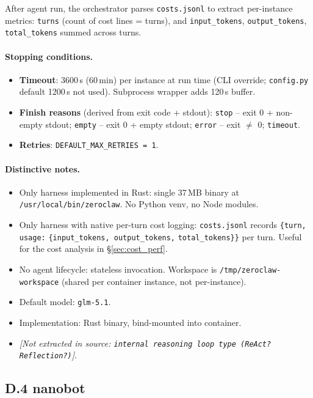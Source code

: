 After agent run, the orchestrator parses \texttt{costs.jsonl} to extract per-instance metrics: \texttt{turns} (count of cost lines = turns), and \texttt{input\_tokens}, \texttt{output\_tokens}, \texttt{total\_tokens} summed across turns.

\paragraph{Stopping conditions.}
\begin{itemize}
  \item \textbf{Timeout}: 3600\,s (60\,min) per instance at run time (CLI override; \texttt{config.py} default 1200\,s not used). Subprocess wrapper adds 120\,s buffer.
  \item \textbf{Finish reasons} (derived from exit code + stdout): \texttt{stop} -- exit 0 + non-empty stdout; \texttt{empty} -- exit 0 + empty stdout; \texttt{error} -- exit $\neq$ 0; \texttt{timeout}.
  \item \textbf{Retries}: \texttt{DEFAULT\_MAX\_RETRIES = 1}.
\end{itemize}

\paragraph{Distinctive notes.}
\begin{itemize}
  \item Only harness implemented in Rust: single 37\,MB binary at \texttt{/usr/local/bin/zeroclaw}. No Python venv, no Node modules.
  \item Only harness with native per-turn cost logging: \texttt{costs.jsonl} records \texttt{\{turn, usage:} \texttt{\{input\_tokens, output\_tokens,} \texttt{total\_tokens\}\}} per turn. Useful for the cost analysis in \S\ref{sec:cost_perf}.
  \item No agent lifecycle: stateless invocation. Workspace is \texttt{/tmp/zeroclaw-workspace} (shared per container instance, not per-instance).
  \item Default model: \texttt{glm-5.1}.
  \item Implementation: Rust binary, bind-mounted into container.
  \item \textit{[Not extracted in source: \texttt{internal reasoning loop type (ReAct? Reflection?)}]}.
\end{itemize}

\subsection*{D.4 nanobot}

